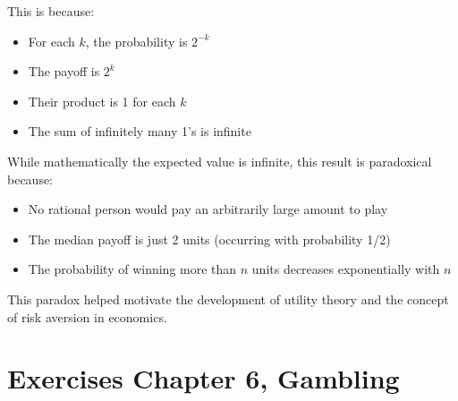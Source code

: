 \documentclass{article}
\begin{document}
\begin{enumerate}
    This is because:
    \begin{itemize}
        \item For each $k$, the probability is $2^{-k}$
        \item The payoff is $2^k$
        \item Their product is 1 for each $k$
        \item The sum of infinitely many 1's is infinite
    \end{itemize}
    
    While mathematically the expected value is infinite, this result is paradoxical because:
    \begin{itemize}
        \item No rational person would pay an arbitrarily large amount to play
        \item The median payoff is just 2 units (occurring with probability 1/2)
        \item The probability of winning more than $n$ units decreases exponentially with $n$
    \end{itemize}
    
    This paradox helped motivate the development of utility theory and the concept of risk aversion in economics.

\end{enumerate}

\section{Exercises Chapter 6, Gambling}
\end{document}
